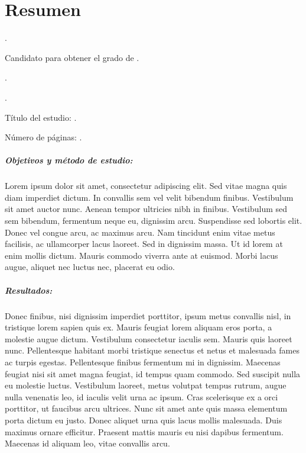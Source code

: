 
\chapter{Resumen}

{\setlength{\leftskip}{10mm}
\setlength{\parindent}{-10mm}

\autor.

Candidato para obtener el grado de \grado\orientacion.

\uanl.

\fime.

Título del estudio: \textsc{\titulo}.

\noindent Número de páginas: \pageref*{lastpage}.}

\paragraph{Objetivos y método de estudio:}

Lorem ipsum dolor sit amet, consectetur adipiscing elit. Sed vitae magna quis diam imperdiet dictum. In convallis sem vel velit bibendum finibus. Vestibulum sit amet auctor nunc. Aenean tempor ultricies nibh in finibus. Vestibulum sed sem bibendum, fermentum neque eu, dignissim arcu. Suspendisse sed lobortis elit. Donec vel congue arcu, ac maximus arcu. Nam tincidunt enim vitae metus facilisis, ac ullamcorper lacus laoreet. Sed in dignissim massa. Ut id lorem at enim mollis dictum. Mauris commodo viverra ante at euismod. Morbi lacus augue, aliquet nec luctus nec, placerat eu odio.


\paragraph{Resultados:}

Donec finibus, nisi dignissim imperdiet porttitor, ipsum metus convallis nisl, in tristique lorem sapien quis ex. Mauris feugiat lorem aliquam eros porta, a molestie augue dictum. Vestibulum consectetur iaculis sem. Mauris quis laoreet nunc. Pellentesque habitant morbi tristique senectus et netus et malesuada fames ac turpis egestas. Pellentesque finibus fermentum mi in dignissim. Maecenas feugiat nisi sit amet magna feugiat, id tempus quam commodo. Sed suscipit nulla eu molestie luctus. Vestibulum laoreet, metus volutpat tempus rutrum, augue nulla venenatis leo, id iaculis velit urna ac ipsum. Cras scelerisque ex a orci porttitor, ut faucibus arcu ultrices. Nunc sit amet ante quis massa elementum porta dictum eu justo. Donec aliquet urna quis lacus mollis malesuada. Duis maximus ornare efficitur. Praesent mattis mauris eu nisi dapibus fermentum. Maecenas id aliquam leo, vitae convallis arcu.

